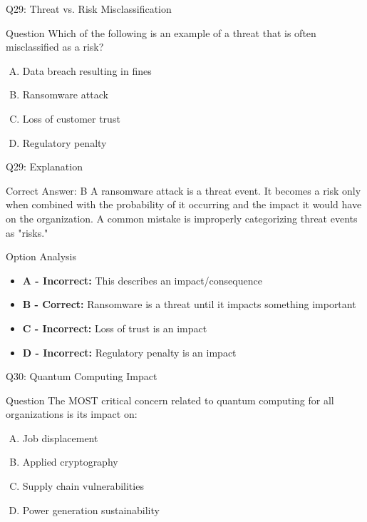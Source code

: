 \documentclass{beamer}
\begin{document}
	\begin{frame}{Q29: Threat vs. Risk Misclassification}
		\begin{block}{Question}
			Which of the following is an example of a threat that is often misclassified as a risk?
		\end{block}
		\begin{enumerate}[(A)]
			\item Data breach resulting in fines
			\item Ransomware attack
			\item Loss of customer trust
			\item Regulatory penalty
		\end{enumerate}
	\end{frame}
	
	\begin{frame}{Q29: Explanation}
		\begin{block}{Correct Answer: B}
			A ransomware attack is a threat event. It becomes a risk only when combined with the probability of it occurring and the impact it would have on the organization. A common mistake is improperly categorizing threat events as "risks."
		\end{block}
		\begin{block}{Option Analysis}
			\begin{itemize}
				\item \textbf{A - Incorrect:} This describes an impact/consequence
				\item \textbf{B - Correct:} Ransomware is a threat until it impacts something important
				\item \textbf{C - Incorrect:} Loss of trust is an impact
				\item \textbf{D - Incorrect:} Regulatory penalty is an impact
			\end{itemize}
		\end{block}
	\end{frame}
	
	\begin{frame}{Q30: Quantum Computing Impact}
		\begin{block}{Question}
			The MOST critical concern related to quantum computing for all organizations is its impact on:
		\end{block}
		\begin{enumerate}[(A)]
			\item Job displacement
			\item Applied cryptography
			\item Supply chain vulnerabilities
			\item Power generation sustainability
		\end{enumerate}
	\end{frame}
	
\end{document}
